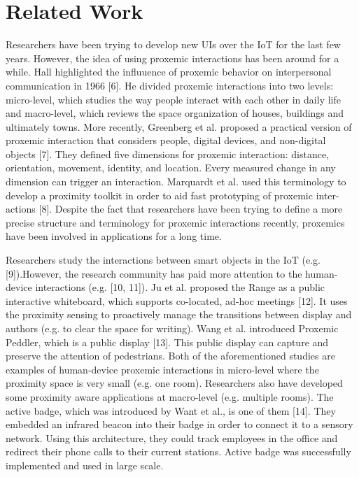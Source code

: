 \documentclass{article}
\begin{document}
\section{Related Work}
Researchers have been trying to develop new UIs over the IoT for the last few years. However, the idea of using proxemic interactions has been around for a while. Hall highlighted the influuence of proxemic behavior on interpersonal communication in 1966 [6]. He divided proxemic interactions into two levels: micro-level, which studies the way people interact with each other in daily life and macro-level, which reviews the space organization of houses, buildings and ultimately towns. More recently, Greenberg et al. proposed a practical version of proxemic interaction that considers people, digital devices, and non-digital
objects [7]. They defined five dimensions for proxemic interaction: distance, orientation, movement, identity, and location. Every measured change in any dimension can trigger an interaction. Marquardt et al. used this terminology to develop a proximity toolkit in order to aid fast prototyping of proxemic inter-actions [8]. Despite the fact that researchers have been trying to define a more precise structure and terminology for proxemic interactions recently, proxemics
have been involved in applications for a long time.


Researchers study the interactions between smart objects in the IoT (e.g. [9]).However, the research community has paid more attention to the human-device interactions (e.g. [10, 11]). Ju et al. proposed the Range as a public interactive whiteboard, which supports co-located, ad-hoc meetings [12]. It uses the proximity sensing to proactively manage the transitions between display and authors (e.g. to clear the space for writing). Wang et al. introduced Proxemic Peddler, which is a public display [13]. This public display can capture and preserve the attention of pedestrians. Both of the aforementioned studies are examples of
human-device proxemic interactions in micro-level where the proximity space is very small (e.g. one room). Researchers also have developed some proximity aware applications at macro-level (e.g. multiple rooms). The active badge, which was introduced by Want et al., is one of them [14]. They embedded an infrared beacon into their badge in order to connect it to a sensory network. Using this architecture, they could track employees in the office and redirect their phone calls to their current stations. Active badge was successfully implemented and used in large scale.
\end{document}
